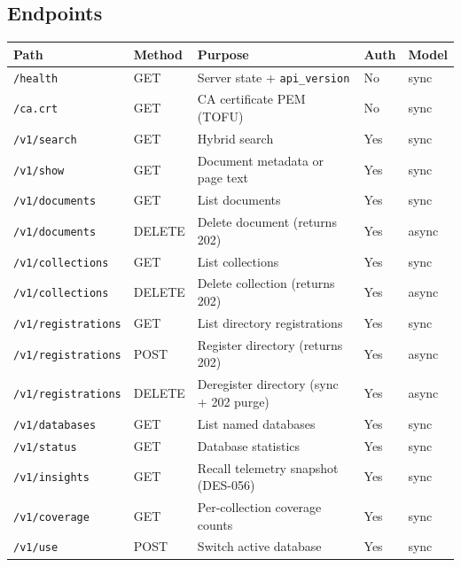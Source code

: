 \documentclass[a4paper,10pt]{article}
\newcommand{\field}[1]{\texttt{#1}}
\begin{document}
\subsection{Endpoints}

\begin{center}
\begin{tabular}{llp{5.3cm}ll}
\toprule
\textbf{Path} & \textbf{Method} & \textbf{Purpose} &
  \textbf{Auth} & \textbf{Model} \\
\midrule
\texttt{/health}              & GET    & Server state + \field{api\_version} & No  & sync  \\
\texttt{/ca.crt}              & GET    & CA certificate PEM (TOFU)        & No  & sync  \\
\texttt{/v1/search}           & GET    & Hybrid search                    & Yes & sync  \\
\texttt{/v1/show}             & GET    & Document metadata or page text   & Yes & sync  \\
\texttt{/v1/documents}        & GET    & List documents                   & Yes & sync  \\
\texttt{/v1/documents}        & DELETE & Delete document (returns 202)    & Yes & async \\
\texttt{/v1/collections}      & GET    & List collections                 & Yes & sync  \\
\texttt{/v1/collections}      & DELETE & Delete collection (returns 202)  & Yes & async \\
\texttt{/v1/registrations}    & GET    & List directory registrations     & Yes & sync  \\
\texttt{/v1/registrations}    & POST   & Register directory (returns 202) & Yes & async \\
\texttt{/v1/registrations}    & DELETE & Deregister directory (sync + 202 purge) & Yes & async \\
\texttt{/v1/databases}        & GET    & List named databases             & Yes & sync  \\
\texttt{/v1/status}           & GET    & Database statistics              & Yes & sync  \\
\texttt{/v1/insights}         & GET    & Recall telemetry snapshot (DES-056) & Yes & sync  \\
\texttt{/v1/coverage}         & GET    & Per-collection coverage counts   & Yes & sync  \\
\texttt{/v1/use}              & POST   & Switch active database           & Yes & sync  \\

\end{tabular}
\end{center}
\end{document}
